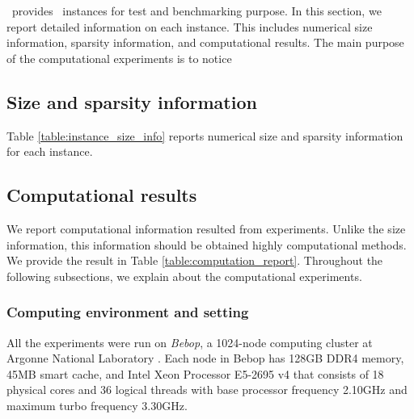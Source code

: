 %
%

\siplibtwo\ provides \smps\ instances for test and benchmarking  purpose. In this section, we report detailed information on each instance. This includes numerical size information, sparsity information, and computational results. The main purpose of the computational experiments is to notice 

\subsection{Size and sparsity information}
Table \ref{table:instance_size_info} reports numerical size and sparsity information for each instance.


\subsection{Computational results}
We report computational information resulted from experiments. Unlike the size information, this information should be obtained highly computational methods. We provide the result in Table \ref{table:computation_report}. Throughout the following subsections, we explain about the computational experiments.

\subsubsection{Computing environment and setting}
All the experiments were run on \textit{Bebop}, a 1024-node computing cluster at Argonne National Laboratory \cite{bebop}. Each node in Bebop has 128GB DDR4 memory, 45MB smart cache, and Intel Xeon Processor E5-2695 v4 that consists of 18 physical cores and 36 logical threads with base processor frequency 2.10GHz and maximum turbo frequency 3.30GHz. 

